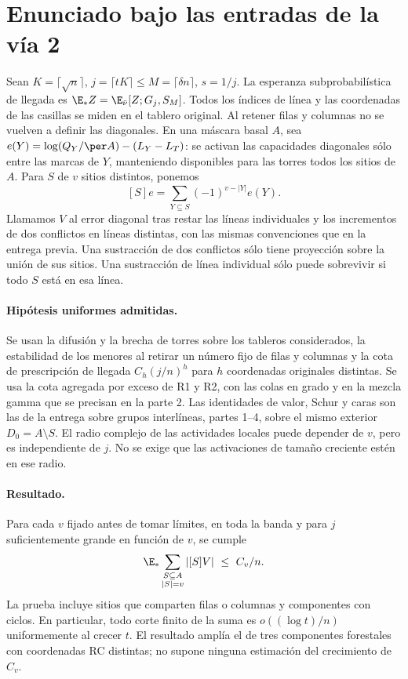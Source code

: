 \section{Enunciado bajo las entradas de la vía 2}
Sean $K=\lceil\sqrt n\rceil$, $j=\lceil tK\rceil\le M=\lceil\delta n\rceil$, $s=1/j$.
La esperanza subprobabilística de llegada es $\E_*Z=\E_{\bar\nu}[Z;G_j,S_M]$.
Todos los índices de línea y las coordenadas de las casillas se miden en el tablero
original. Al retener filas y columnas no se vuelven a definir las diagonales.
En una máscara basal $A$, sea $e(Y)=\log(Q_Y/\per A)-(L_Y-L_T)$: se activan las
capacidades diagonales sólo entre las marcas de $Y$, manteniendo disponibles para
las torres todos los sitios de $A$. Para $S$ de $v$ sitios distintos, ponemos
\[
 [S]e=\sum_{Y\subseteq S}(-1)^{v-|Y|}e(Y).
\]
Llamamos $V$ al error diagonal tras restar las líneas individuales y los incrementos
de dos conflictos en líneas distintas, con las mismas convenciones que en la entrega previa.
Una sustracción de dos conflictos sólo tiene proyección sobre la unión de sus sitios.
Una sustracción de línea individual sólo puede sobrevivir si todo $S$ está en esa línea.

\paragraph{Hipótesis uniformes admitidas.}
Se usan la difusión y la brecha de torres sobre los tableros considerados, la estabilidad
de los menores al retirar un número fijo de filas y columnas y la cota de prescripción
de llegada $C_h(j/n)^h$ para $h$ coordenadas originales distintas. Se usa la cota agregada
por exceso de R1 y R2, con las colas en grado y en la mezcla gamma que se precisan en la
parte 2. Las identidades de valor, Schur y caras son las de la entrega sobre grupos
interlíneas, partes 1--4, sobre el mismo exterior $D_0=A\setminus S$. El radio complejo
de las actividades locales puede depender de $v$, pero es independiente de $j$.
No se exige que las activaciones de tamaño creciente estén en ese radio.

\paragraph{Resultado.}
Para cada $v$ fijado antes de tomar límites, en toda la banda y para $j$ suficientemente
grande en función de $v$, se cumple
\[
 \E_*\sum_{\substack{S\subseteq A\\ |S|=v}}|[S]V|\ \le\ C_v/n .
\]
La prueba incluye sitios que comparten filas o columnas y componentes con ciclos.
En particular, todo corte finito de la suma es $o((\log t)/n)$ uniformemente al crecer $t$.
El resultado amplía el de tres componentes forestales con coordenadas RC distintas;
no supone ninguna estimación del crecimiento de $C_v$.

